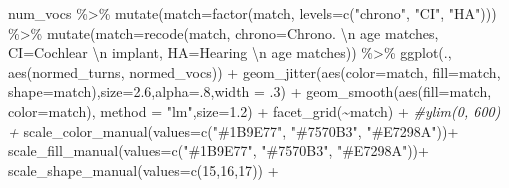 \documentclass[
]{article}
\newenvironment{Shaded}{\begin{snugshade}}{\end{snugshade}}
\newcommand{\AttributeTok}[1]{\textcolor[rgb]{0.77,0.63,0.00}{#1}}
\newcommand{\CommentTok}[1]{\textcolor[rgb]{0.56,0.35,0.01}{\textit{#1}}}
\newcommand{\DecValTok}[1]{\textcolor[rgb]{0.00,0.00,0.81}{#1}}
\newcommand{\FloatTok}[1]{\textcolor[rgb]{0.00,0.00,0.81}{#1}}
\newcommand{\FunctionTok}[1]{\textcolor[rgb]{0.00,0.00,0.00}{#1}}
\newcommand{\NormalTok}[1]{#1}
\newcommand{\SpecialCharTok}[1]{\textcolor[rgb]{0.00,0.00,0.00}{#1}}
\newcommand{\StringTok}[1]{\textcolor[rgb]{0.31,0.60,0.02}{#1}}
\begin{document}
\begin{Shaded}
\begin{Highlighting}[]
\NormalTok{num\_vocs }\SpecialCharTok{\%\textgreater{}\%}
  \FunctionTok{mutate}\NormalTok{(}\AttributeTok{match=}\FunctionTok{factor}\NormalTok{(match, }\AttributeTok{levels=}\FunctionTok{c}\NormalTok{(}\StringTok{"chrono"}\NormalTok{, }\StringTok{"CI"}\NormalTok{, }\StringTok{"HA"}\NormalTok{))) }\SpecialCharTok{\%\textgreater{}\%}
  \FunctionTok{mutate}\NormalTok{(}\AttributeTok{match=}\FunctionTok{recode}\NormalTok{(match,}
                      \AttributeTok{chrono=}\StringTok{\textquotesingle{}Chrono. }\SpecialCharTok{\textbackslash{}n}\StringTok{ age matches\textquotesingle{}}\NormalTok{,}
                      \AttributeTok{CI=}\StringTok{\textquotesingle{}Cochlear }\SpecialCharTok{\textbackslash{}n}\StringTok{ implant\textquotesingle{}}\NormalTok{,}
                      \AttributeTok{HA=}\StringTok{\textquotesingle{}Hearing }\SpecialCharTok{\textbackslash{}n}\StringTok{ age matches\textquotesingle{}}\NormalTok{)) }\SpecialCharTok{\%\textgreater{}\%}
\FunctionTok{ggplot}\NormalTok{(., }\FunctionTok{aes}\NormalTok{(normed\_turns, normed\_vocs)) }\SpecialCharTok{+}
  \FunctionTok{geom\_jitter}\NormalTok{(}\FunctionTok{aes}\NormalTok{(}\AttributeTok{color=}\NormalTok{match, }\AttributeTok{fill=}\NormalTok{match, }\AttributeTok{shape=}\NormalTok{match),}\AttributeTok{size=}\FloatTok{2.6}\NormalTok{,}\AttributeTok{alpha=}\NormalTok{.}\DecValTok{8}\NormalTok{,}\AttributeTok{width =}\NormalTok{ .}\DecValTok{3}\NormalTok{) }\SpecialCharTok{+}
  \FunctionTok{geom\_smooth}\NormalTok{(}\FunctionTok{aes}\NormalTok{(}\AttributeTok{fill=}\NormalTok{match, }\AttributeTok{color=}\NormalTok{match), }\AttributeTok{method =} \StringTok{"lm"}\NormalTok{,}\AttributeTok{size=}\FloatTok{1.2}\NormalTok{) }\SpecialCharTok{+} 
  \FunctionTok{facet\_grid}\NormalTok{(}\SpecialCharTok{\textasciitilde{}}\NormalTok{match) }\SpecialCharTok{+}
  \CommentTok{\#ylim(0, 600) +}
  \FunctionTok{scale\_color\_manual}\NormalTok{(}\AttributeTok{values=}\FunctionTok{c}\NormalTok{(}\StringTok{"\#1B9E77"}\NormalTok{, }\StringTok{"\#7570B3"}\NormalTok{, }\StringTok{"\#E7298A"}\NormalTok{))}\SpecialCharTok{+}
  \FunctionTok{scale\_fill\_manual}\NormalTok{(}\AttributeTok{values=}\FunctionTok{c}\NormalTok{(}\StringTok{"\#1B9E77"}\NormalTok{, }\StringTok{"\#7570B3"}\NormalTok{, }\StringTok{"\#E7298A"}\NormalTok{))}\SpecialCharTok{+}
  \FunctionTok{scale\_shape\_manual}\NormalTok{(}\AttributeTok{values=}\FunctionTok{c}\NormalTok{(}\DecValTok{15}\NormalTok{,}\DecValTok{16}\NormalTok{,}\DecValTok{17}\NormalTok{)) }\SpecialCharTok{+}

\end{Highlighting}
\end{Shaded}
\end{document}
